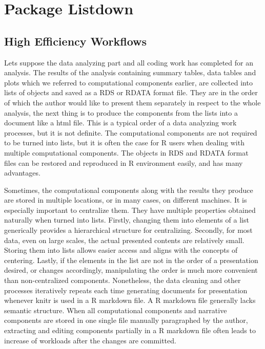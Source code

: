 \documentclass[
]{article}
\begin{document}
\hypertarget{package-listdown}{%
\section{Package Listdown}\label{package-listdown}}

\hypertarget{high-efficiency-workflows}{%
\subsection{High Efficiency Workflows}\label{high-efficiency-workflows}}

Lets suppose the data analyzing part and all coding work has completed
for an analysis. The results of the analysis containing summary tables,
data tables and plots which we referred to computational components
earlier, are collected into lists of objects and saved as a RDS or RDATA
format file. They are in the order of which the author would like to
present them separately in respect to the whole analysis, the next thing
is to produce the components from the lists into a document like a html
file. This is a typical order of a data analyzing work processes, but it
is not definite. The computational components are not required to be
turned into lists, but it is often the case for R users when dealing
with multiple computational components. The objects in RDS and RDATA
format files can be restored and reproduced in R environment easily, and
has many advantages.

Sometimes, the computational components along with the results they
produce are stored in multiple locations, or in many cases, on different
machines. It is especially important to centralize them. They have
multiple properties obtained naturally when turned into lists. Firstly,
changing them into elements of a list generically provides a
hierarchical structure for centralizing. Secondly, for most data, even
on large scales, the actual presented contents are relatively small.
Storing them into lists allows easier access and aligns with the
concepts of centering. Lastly, if the elements in the list are not in
the order of a presentation desired, or changes accordingly,
manipulating the order is much more convenient than non-centralized
components. Nonetheless, the data cleaning and other processes
iteratively repeats each time generating documents for presentation
whenever knitr is used in a R markdown file. A R markdown file generally
lacks semantic structure. When all computational components and
narrative components are stored in one single file manually paragraphed
by the author, extracting and editing components partially in a R
markdown file often leads to increase of workloads after the changes are
committed.
\end{document}

